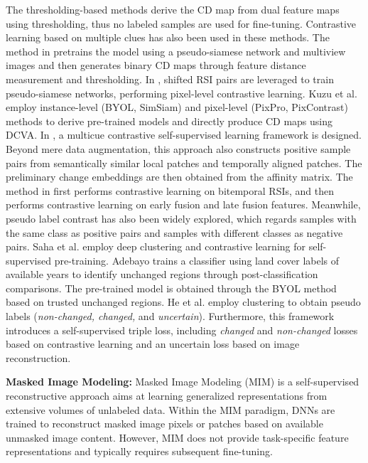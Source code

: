 \par The thresholding-based methods derive the CD map from dual feature maps using thresholding, thus no labeled samples are used for fine-tuning. Contrastive learning based on multiple clues has also been used in these methods. The method in \cite{chen2021self} pretrains the model using a pseudo-siamese network and multiview images and then generates binary CD maps through feature distance measurement and thresholding. In \cite{chen2022self}, shifted RSI pairs are leveraged to train pseudo-siamese networks, performing pixel-level contrastive learning. Kuzu et al. \cite{kuzu2024forest} employ instance-level (BYOL, SimSiam) and pixel-level (PixPro, PixContrast) methods to derive pre-trained models and directly produce CD maps using DCVA. In \cite{yang2023multicue}, a multicue contrastive self-supervised learning framework is designed. Beyond mere data augmentation, this approach also constructs positive sample pairs from semantically similar local patches and temporally aligned patches. The preliminary change embeddings are then obtained from the affinity matrix. The method in \cite{qu2023tdsscd} first performs contrastive learning on bitemporal RSIs, and then performs contrastive learning on early fusion and late fusion features. 
Meanwhile, pseudo label contrast has also been widely explored, which regards samples with the same class as positive pairs and samples with different classes as negative pairs. Saha et al. \cite{9538396} employ deep clustering and contrastive learning for self-supervised pre-training. Adebayo \cite{adebayo2023detecting} trains a classifier using land cover labels of available years to identify unchanged regions through post-classification comparisons.  The pre-trained model is obtained through the BYOL method based on trusted unchanged regions. He et al. \cite{zong2024multi} employ clustering to obtain pseudo labels (\textit{non-changed, changed,} and \textit{uncertain}). Furthermore, this framework introduces a self-supervised triple loss, including \textit{changed} and\textit{ non-changed} losses based on contrastive learning and an uncertain loss based on image reconstruction.

\textbf{Masked Image Modeling:} Masked Image Modeling (MIM) is a self-supervised reconstructive approach aims at learning generalized representations from extensive volumes of unlabeled data. Within the MIM paradigm, DNNs are trained to reconstruct masked image pixels or patches based on available unmasked image content. However, MIM does not provide task-specific feature representations and typically requires subsequent fine-tuning.

